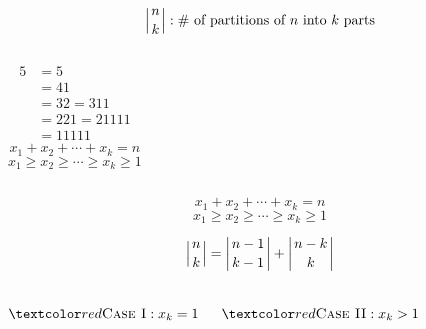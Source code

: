 
\begin{frame}{}
  \[
    \left| n \atop k \right|: \# \text{ of partitions of $n$ into $k$ parts}
  \]

  \begin{columns}
    \pause
      \begin{align*}
        5 &= 5 \\[3pt]
          &= 4 1 \\[3pt]
          &= 3 2 = 3 1 1 \\[3pt]
          &= 2 2 1 = 2 1 1 1 1 \\[3pt]
          &= 1 1 1 1 1
      \end{align*}
    \pause
      \[
        x_1 + x_2 + \cdots + x_k = n
      \]
      \[
        x_1 \ge x_2 \ge \cdots \ge x_k \ge 1
      \]
  \end{columns}
\end{frame}

\begin{frame}{}
  \[
    x_1 + x_2 + \cdots + x_k = n
  \]
  \[
    x_1 \ge x_2 \ge \cdots \ge x_k \ge 1
  \]

  \begin{theorem}
    \[
      \left| n \atop k \right| = \left| n-1 \atop k-1 \right| + \left| n-k \atop k \right|
    \]
  \end{theorem}

  \pause
  \begin{columns}
    \[
      \red{\text{\textsc{Case I}}: x_k = 1}
    \]

      \[
        \red{\text{\textsc{Case II}}: x_k > 1}
      \]
  \end{columns}
\end{frame}

